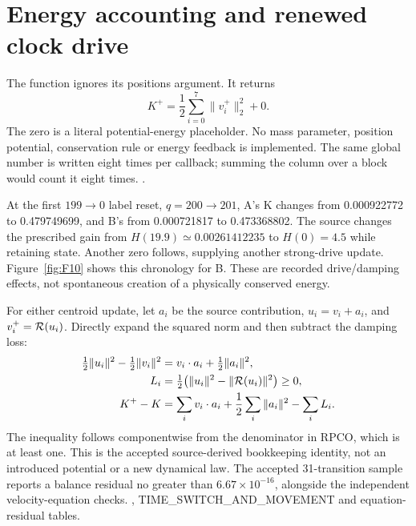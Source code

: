\section{Energy accounting and renewed clock drive}
The function  ignores its positions argument.
It returns
\begin{equation}\label{eq:K03}
K^+=\frac12\sum_{i=0}^7\|v_i^+\|_2^2+0.
\end{equation}
The zero is a literal potential-energy placeholder. No mass parameter,
position potential, conservation rule or energy feedback is implemented.
The same global number is written eight times per callback; summing
the column over a block would count it eight times.
. 

At the first $199\to 0$ label reset, $q=200\to 201$, A's K changes
from 0.000922772 to 0.479749699, and B's from 0.000721817 to
0.473368802. The source changes the prescribed gain from
$H(19.9)\simeq0.00261412235$ to $H(0)=4.5$ while retaining state.
Another zero follows, supplying another strong-drive update.
Figure~\ref{fig:F10} shows this chronology for B. These are recorded
drive/damping effects, not spontaneous creation of a physically
conserved energy. 

For either centroid update, let $a_i$ be the source contribution,
$u_i=v_i+a_i$, and $v_i^+=\mathcal R(u_i)$. Directly expand the squared norm
and then subtract the damping loss:
\begin{align}
\tfrac12\|u_i\|^2-\tfrac12\|v_i\|^2
 &=v_i\cdot a_i+\tfrac12\|a_i\|^2,\\
L_i&=\tfrac12\bigl(\|u_i\|^2-\|\mathcal R(u_i)\|^2\bigr)\geq0,\\
K^+-K&=\sum_i v_i\cdot a_i+\frac12\sum_i\|a_i\|^2-\sum_iL_i.
\label{eq:energybalance}
\end{align}
The inequality follows componentwise from the denominator in RPCO,
which is at least one. This is the accepted source-derived
bookkeeping identity, not an introduced potential or a new dynamical
law. The accepted 31-transition sample reports a balance residual
no greater than $6.67\times10^{-16}$, alongside the independent
velocity-equation checks. \cite{study03}, TIME\_SWITCH\_AND\_MOVEMENT
and equation-residual tables. 



